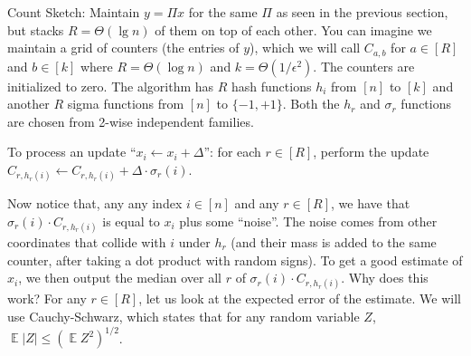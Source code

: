 \documentclass[11pt]{article}
\DeclareMathOperator*{\E}{\mathbb{E}}
\begin{document}
Count Sketch: Maintain $y = \Pi x$ for the same $\Pi$ as seen in the previous section, but stacks $R = \Theta(\lg n)$ of them on top of each other. You can imagine we maintain a grid of counters (the entries of $y$), which we will call $C_{a,b}$ for $a\in[R]$ and $b\in[k]$ where $R = \Theta(\log n)$ and $k = \Theta(1/\epsilon^2)$. The counters are initialized to zero. The algorithm has $R$ hash functions $h_{i}$ from $[n]$ to $[k]$ and another $R$ sigma functions from $[n]$ to $\{-1,+1\}$. Both the $h_r$ and $\sigma_r$ functions are chosen from 2-wise independent families. 

To process an update ``$x_{i} \leftarrow x_{i} + \Delta$'': for each $r\in[R]$, perform the update $C_{r,h_r(i)} \leftarrow C_{r,h_r(i)} + \Delta \cdot \sigma_r(i)$.

Now notice that, any any index $i\in[n]$ and any $r\in[R]$, we have that $\sigma_r(i)\cdot C_{r,h_r(i)}$ is equal to $x_i$ plus some ``noise''. The noise comes from other coordinates that collide with $i$ under $h_r$ (and their mass is added to the same counter, after taking a dot product with random signs). To get a good estimate of $x_i$, we then output the median over all $r$ of $\sigma_r(i)\cdot C_{r,h_r(i)}$. Why does this work? For any $r\in[R]$, let us look at the expected error of the estimate. We will use Cauchy-Schwarz, which states that for any random variable $Z$, $\E |Z| \le (\E Z^2)^{1/2}$.
\end{document}
